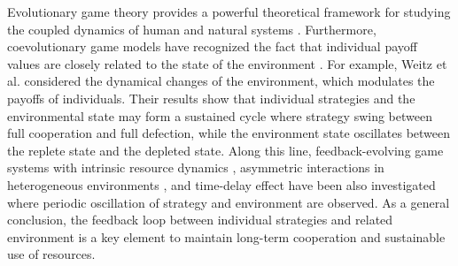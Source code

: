 \documentclass[9pt]{elife}
\begin{document}
Evolutionary game theory provides a powerful theoretical framework for studying the coupled dynamics of human and natural systems \citep{smith1982evolution,weibull1997evolutionary,stewart2014collapse,radzvilavicius2019evolution,park2020cyclic,niehus2021evolution,han2021or,cooper2021evolution}. Furthermore, coevolutionary game models have recognized the fact that individual payoff values are closely related to the state of the environment \citep{weitz2016oscillating,szolnoki2018environmental,chen2018punishment,hauert2019asymmetric,tilman2020evolutionary,wang2020eco,yan2021cooperator}. For example, Weitz et al. \citep{weitz2016oscillating} considered the dynamical changes of the environment, which modulates the payoffs of individuals. Their results show that individual strategies and the environmental state may form a sustained cycle where strategy swing between full cooperation and full defection, while the environment state oscillates between the replete state and the depleted state.
Along this line, feedback-evolving game systems with intrinsic resource dynamics \citep{tilman2020evolutionary}, asymmetric interactions in heterogeneous environments \citep{hauert2019asymmetric}, and time-delay effect \citep{yan2021cooperator} have been also investigated where periodic oscillation of strategy and environment are observed. As a general conclusion, the feedback loop between individual strategies and related environment is a key element to maintain long-term cooperation and sustainable use of resources.
\end{document}
